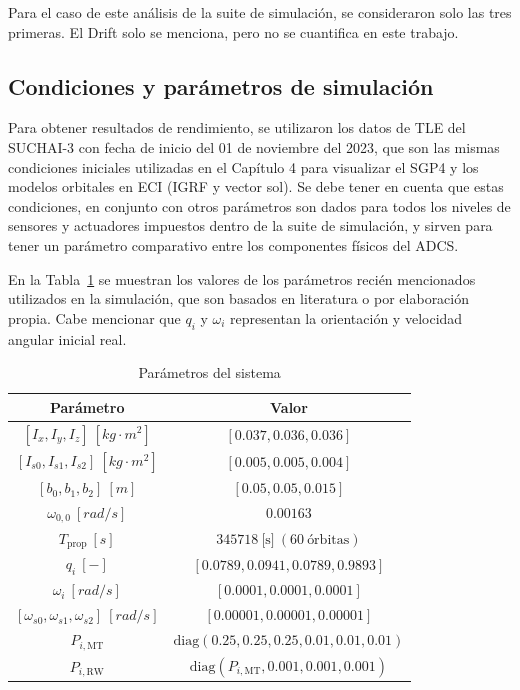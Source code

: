 Para el caso de este análisis de la suite de simulación, se consideraron solo las tres primeras. El Drift solo se menciona, pero no se cuantifica en este trabajo.

\subsection{Condiciones y parámetros de simulación}

Para obtener resultados de rendimiento, se utilizaron los datos de TLE del SUCHAI-3 con fecha de inicio del 01 de noviembre del 2023, que son las mismas condiciones iniciales utilizadas en el Capítulo 4 para visualizar el SGP4 y los modelos orbitales en ECI (IGRF y vector sol). Se debe tener en cuenta que estas condiciones, en conjunto con otros parámetros son dados para todos los niveles de sensores y actuadores impuestos dentro de la suite de simulación, y sirven para tener un parámetro comparativo entre los componentes físicos del ADCS.

En la Tabla~\ref{tab:parametros} se muestran los valores de los parámetros recién mencionados utilizados en la simulación, que son basados en literatura \cite{ref14,ref41,ref44} o por elaboración propia. Cabe mencionar que $q_i$ y $\omega_i$ representan la orientación y velocidad angular inicial real.

\begin{table}[h!]
	\centering
	\caption{Parámetros del sistema}
	\begin{tabular}{|c|c|}
		\hline
		\textbf{Parámetro} & \textbf{Valor} \\
		\hline
		$[I_x, I_y, I_z] \ [kg \cdot m^2]$ & $[0.037, 0.036, 0.036]$ \\
		\hline		
		$[I_{s0}, I_{s1}, I_{s2}] \ [kg \cdot m^2]$ & $[0.005, 0.005, 0.004]$ \\
		\hline
		$[b_0, b_1, b_2] \ [m]$ & $[0.05, 0.05, 0.015]$ \\
		\hline		
		$\omega_{0,0} \ [rad/s]$ & $0.00163$ \\
		\hline
		$T_{\text{prop}} \ [s]$ & $345718 \ \text{[s]} \ (60 \ \text{órbitas})$ \\
		\hline
		$q_i \ [-]$ & $\left[ 0.0789, 0.0941, 0.0789, 0.9893 \right]$ \\
		\hline
		$\omega_i \ [rad/s]$ & $[0.0001, 0.0001, 0.0001]$ \\
		\hline
		$[\omega_{s0}, \omega_{s1}, \omega_{s2}] \ [rad/s]$ & $[0.00001, 0.00001, 0.00001]$ \\
		\hline
		$P_{i, \text{MT}}$ & $\text{diag}(0.25, 0.25, 0.25, 0.01, 0.01, 0.01)$ \\
		\hline
		$P_{i, \text{RW}}$ & $\text{diag}(P_{i, \text{MT}}, 0.001, 0.001, 0.001)$ \\
		\hline
	\end{tabular}

	\label{tab:parametros}
\end{table}

